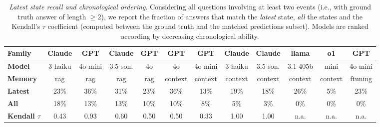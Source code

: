 \documentclass{article}
\begin{document}

\begin{table}[h]
\centering
\caption{\textit{Latest state recall and chronological ordering}.  Considering all   questions involving at least two events (i.e., with ground truth answer of length $\geq 2$), we report the fraction of  answers that match the \textit{latest} state, \textit{all} the states and the  Kendall's $\tau$ coefficient (computed between the ground truth and the matched predictions subset). Models are ranked according by decreasing chronological ability.}
\label{tab:result_latest_chrono}
\begin{scriptsize}
\begin{tabular}{@{}lccccccccccc@{}}
\toprule
\bf \scriptsize Family & Claude   & GPT & Claude  & GPT  & GPT &  GPT & Claude &  Claude & llama & o1 & GPT \\
\midrule
\bf \scriptsize Model & \scriptsize 3-haiku & \scriptsize   4o-mini & \scriptsize 3.5-son. & \scriptsize  4o & \scriptsize  4o  & \scriptsize 4o-mini & \scriptsize  3-haiku & \scriptsize  \scriptsize 3.5-son. & \scriptsize 3.1-405b & \scriptsize mini & \scriptsize 4o-mini \\
\bf \scriptsize Memory & \scriptsize rag   & \scriptsize rag  &  \scriptsize rag          &\scriptsize rag &\scriptsize  context & \scriptsize  context & \scriptsize context & \scriptsize context  & \scriptsize context & \scriptsize context & \scriptsize  ftuning\\
\midrule
\bf \scriptsize Latest & 23\%   &  36\%  &   31\%  & 23\%    &  36\%  & 13\%      & 19\%  &   18\%  &   26\%     &  5\%   &   23\%    \\ %
\bf \scriptsize All & 18\%    &   13\%   &  13\%  & 10\%   & 10\% & 8\%      & 5\%  & 3\%    & 0\%  & 0\%   & 0\%    \\
\bf \scriptsize Kendall $\tau$ & 0.43    & 0.93   & 0.60  & 0.50  & 0.50 & 0.33  & 1.00 & 1.00 & n.a. & n.a.  & n.a.\\
\bottomrule
\end{tabular}
\end{scriptsize}
\end{table}
\end{document}
